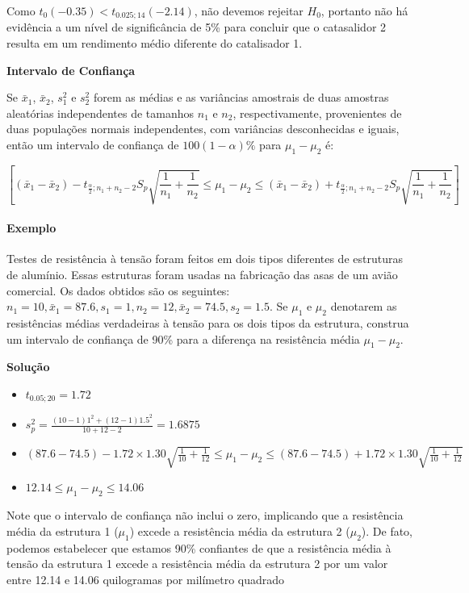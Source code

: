 \documentclass[
]{book}
\providecommand{\tightlist}{%
  \setlength{\itemsep}{0pt}\setlength{\parskip}{0pt}}
\begin{document}
Como \(t_0(-0.35)<t_{0.025;14}(-2.14)\), não devemos rejeitar \(H_0\), portanto não há evidência a um nível de significância de 5\% para concluir que o catasalidor 2 resulta em um rendimento médio diferente do catalisador 1.

\textbf{Intervalo de Confiança}

Se \(\bar x_1\), \(\bar x_2\), \(s_1^2\) e \(s_2^2\) forem as médias e as variâncias amostrais de duas amostras aleatórias independentes de tamanhos \(n_1\) e \(n_2\), respectivamente, provenientes de duas populações normais independentes, com variâncias desconhecidas e iguais, então um intervalo de confiança de \(100(1-\alpha)\%\) para \(\mu_1-\mu_2\) é:

\[\left[(\bar x_1-\bar x_2) -t_{\frac{\alpha}{2};n_1+n_2-2}S_p\sqrt{\frac{1}{n_1}+\frac{1}{n_2}}\leq \mu_1-\mu_2 \leq (\bar x_1-\bar x_2) +t_{\frac{\alpha}{2};n_1+n_2-2}S_p\sqrt{\frac{1}{n_1}+\frac{1}{n_2}}\right]\]

\hypertarget{exemplo-12}{%
\paragraph{Exemplo}\label{exemplo-12}}

Testes de resistência à tensão foram feitos em dois tipos diferentes de estruturas de alumínio. Essas estruturas foram usadas na fabricação das asas de um avião comercial. Os dados obtidos são os seguintes: \(n_1=10, \bar x_1=87.6, s_1=1, n_2=12, \bar x_2=74.5, s_2=1.5\). Se \(\mu_1\) e \(\mu_2\) denotarem as resistências médias verdadeiras à tensão para os dois tipos da estrutura, construa um intervalo de confiança de 90\% para a diferença na resistência média \(\mu_1-\mu_2\).

\textbf{Solução}

\begin{itemize}
\tightlist
\item
  \(t_{0.05;20}=1.72\)
\item
  \(s^2_p=\frac{(10-1)1^2+(12-1)1.5^2}{10+12-2}=1.6875\)
\item
  \((87.6-74.5) -1.72\times 1.30\sqrt{\frac{1}{10}+\frac{1}{12}}\leq \mu_1-\mu_2 \leq (87.6-74.5) +1.72\times 1.30\sqrt{\frac{1}{10}+\frac{1}{12}}\)
\item
  \(12.14 \leq \mu_1-\mu_2 \leq 14.06\)
\end{itemize}

Note que o intervalo de confiança não inclui o zero, implicando que a resistência média da estrutura 1 (\(\mu_1\)) excede a resistência média da estrutura 2 (\(\mu_2\)). De fato, podemos estabelecer que estamos 90\% confiantes de que a resistência média à tensão da estrutura 1 excede a resistência média da estrutura 2 por um valor entre 12.14 e 14.06 quilogramas por milímetro quadrado
\end{document}
